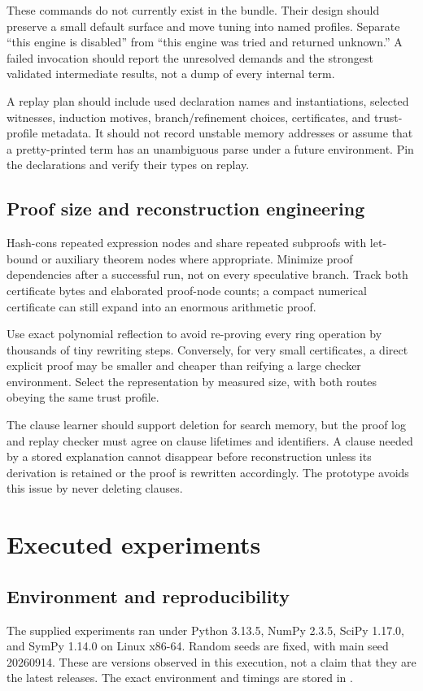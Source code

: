 \documentclass[11pt,letterpaper]{article}
\newcommand{\code}[1]{\texttt{\detokenize{#1}}}
\theoremstyle{definition}\newtheorem{definition}[proposition]{Definition}
\begin{document}
These commands do not currently exist in the bundle. Their design should preserve a small default surface and move tuning into named profiles. Separate ``this engine is disabled'' from ``this engine was tried and returned unknown.'' A failed invocation should report the unresolved demands and the strongest validated intermediate results, not a dump of every internal term.

A replay plan should include used declaration names and instantiations, selected witnesses, induction motives, branch/refinement choices, certificates, and trust-profile metadata. It should not record unstable memory addresses or assume that a pretty-printed term has an unambiguous parse under a future environment. Pin the declarations and verify their types on replay.

\subsection{Proof size and reconstruction engineering}
Hash-cons repeated expression nodes and share repeated subproofs with let-bound or auxiliary theorem nodes where appropriate. Minimize proof dependencies after a successful run, not on every speculative branch. Track both certificate bytes and elaborated proof-node counts; a compact numerical certificate can still expand into an enormous arithmetic proof.

Use exact polynomial reflection to avoid re-proving every ring operation by thousands of tiny rewriting steps. Conversely, for very small certificates, a direct explicit proof may be smaller and cheaper than reifying a large checker environment. Select the representation by measured size, with both routes obeying the same trust profile.

The clause learner should support deletion for search memory, but the proof log and replay checker must agree on clause lifetimes and identifiers. A clause needed by a stored explanation cannot disappear before reconstruction unless its derivation is retained or the proof is rewritten accordingly. The prototype avoids this issue by never deleting clauses.

\section{Executed experiments}
\label{sec:experiments}
\subsection{Environment and reproducibility}
The supplied experiments ran under Python 3.13.5, NumPy 2.3.5, SciPy 1.17.0, and SymPy 1.14.0 on Linux x86-64. Random seeds are fixed, with main seed 20260914. These are versions observed in this execution, not a claim that they are the latest releases. The exact environment and timings are stored in \code{results/summary.json}.
\end{document}
